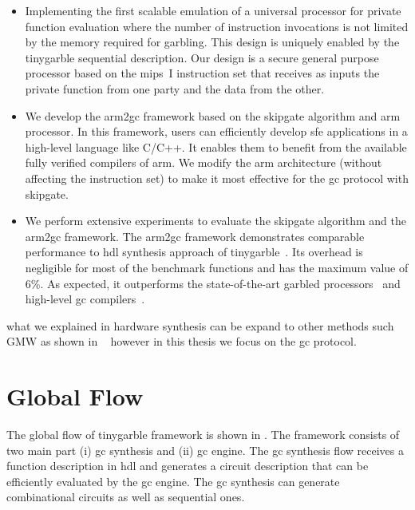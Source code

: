 \begin{itemize}
\item
  Implementing the first scalable emulation of a universal processor for private function evaluation where the number of instruction invocations is not limited by the memory required for garbling.
  This design is uniquely enabled by the \gls{tinygarble} sequential description.
  Our design is a secure general purpose processor based on the \gls{mips}~I instruction set that receives as inputs the private function from one party and the data from the other.
\item We develop the \gls{arm2gc} framework based on the \gls{skipgate} algorithm and \gls{arm} processor.
    In this framework, users can efficiently develop \acrshort{sfe} applications in a high-level language like C/C++.
    It enables them to benefit from the available fully verified compilers of \gls{arm}.
    We modify the \gls{arm} architecture (without affecting the instruction set) to make it most effective for the \acrshort{gc} protocol with \gls{skipgate}.
\item We perform extensive experiments to evaluate the \gls{skipgate} algorithm and the \gls{arm2gc} framework.
    The \gls{arm2gc} framework demonstrates comparable performance to \acrshort{hdl} synthesis approach of \gls{tinygarble}~\cite{songhori2015tinygarble}.
    Its overhead is negligible for most of the benchmark functions and has the maximum value of 6\%.
    As expected, it outperforms the state-of-the-art garbled processors~\cite{wang2016secure, songhori2016garbledcpu} and high-level \acrshort{gc} compilers~\cite{holzer2012secure, mood2016frigate}.
\end{itemize}

what we explained in hardware synthesis can be expand to other methods such GMW as shown in ~\cite{demmler2015automated} however in this thesis we focus on the \acrshort{gc} protocol.

\section{Global Flow}
The global flow of \gls{tinygarble} framework is shown in .
The framework consists of two main part (i) \acrshort{gc} synthesis and (ii) \acrshort{gc} engine.
The \acrshort{gc} synthesis flow receives a function description in \acrshort{hdl} and generates a circuit description that can be efficiently evaluated by the \acrshort{gc} engine.
The \acrshort{gc} synthesis can generate combinational circuits as well as sequential ones.

